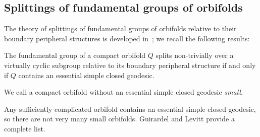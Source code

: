 \subsection{Splittings of fundamental groups of orbifolds}

The theory of splittings of fundamental groups of orbifolds relative to their boundary peripheral structures is developed in~\cite{guirardellevitt17}; we recall the following results:

\begin{lemma}\cite[Corollary 5.6]{guirardellevitt17}\label{lemma:splitting_if_not_small}
  The fundamental group of a compact orbifold $Q$ splits non-trivially over a virtually cyclic subgroup relative to its boundary peripheral structure if and only if $Q$ contains an essential simple closed geodesic.
\end{lemma}

\begin{definition} We call a compact orbifold without an essential simple closed geodesic 
\emph{small}.\end{definition}

Any sufficiently complicated orbifold contains an essential simple closed geodesic, so there are not very many small orbifolds.
Guirardel and Levitt provide a complete list.

